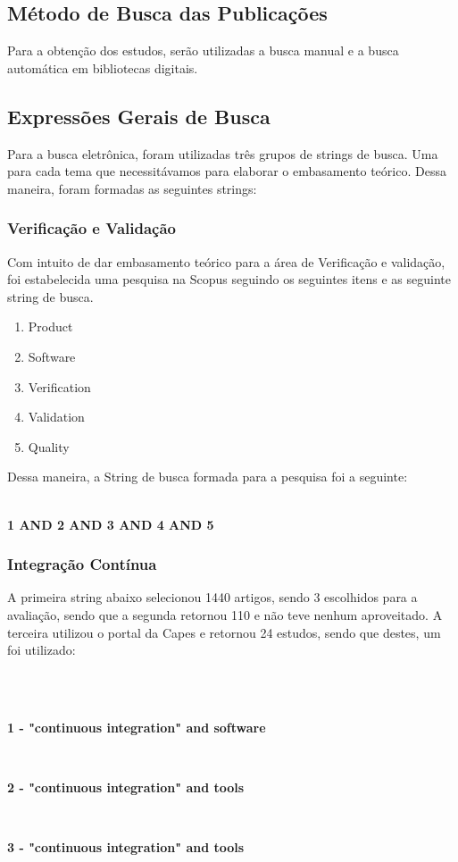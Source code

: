 \subsection{Método de Busca das Publicações}
\label{sub:Método de Busca das Publicações}
Para a obtenção dos estudos, serão utilizadas a busca manual e a busca
automática em bibliotecas digitais.

\subsection{Expressões Gerais de Busca}
\label{sub:Expressões Gerais de Busca}
Para a busca eletrônica, foram utilizadas três grupos de strings de busca.
Uma para cada tema que necessitávamos para elaborar o embasamento teórico.
Dessa maneira, foram formadas as seguintes strings:

\subsubsection{Verificação e Validação}
\label{sub:Verificação e Validação}
Com intuito de dar embasamento teórico para a área de Verificação e validação,
foi estabelecida uma pesquisa na Scopus seguindo os seguintes itens e as
seguinte string de busca.
\begin{enumerate}
    \item Product
    \item Software
    \item Verification
    \item Validation
    \item Quality
\end{enumerate}
Dessa maneira, a String de busca formada para a pesquisa foi a seguinte:
\\
\\
\centerline{\textbf{1 AND 2 AND 3 AND 4 AND 5}}

\subsubsection{Integração Contínua}
\label{sub:Integração Contínua}
A primeira string abaixo selecionou 1440 artigos, sendo 3 escolhidos para a
avaliação, sendo que a segunda retornou 110 e não teve nenhum aproveitado. A
terceira utilizou o portal da Capes e retornou 24 estudos, sendo que destes, um
foi utilizado:

\\
\\
\centerline{\textbf{1 - "continuous integration" and software}}
\\
\centerline{\textbf{2 - "continuous integration" and tools}}
\\
\centerline{\textbf{3 - "continuous integration" and tools}}


